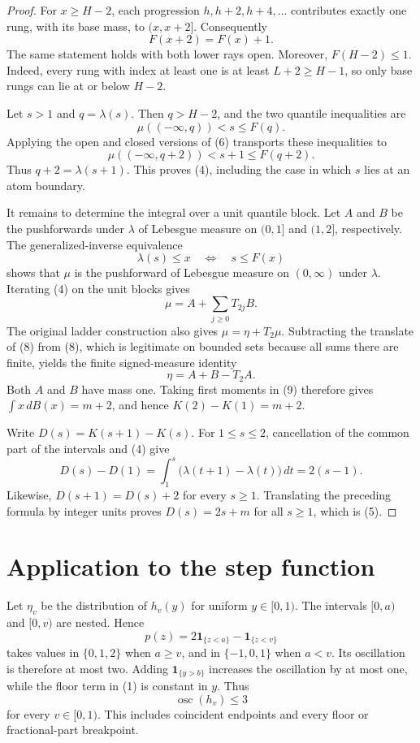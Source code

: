 \documentclass[11pt]{article}
\newcommand{\ind}{\mathbf 1}
\begin{document}
\begin{proof}
For \(x\geq H-2\), each progression
\(h,h+2,h+4,\ldots\) contributes exactly one rung, with its base mass,
to \((x,x+2]\).  Consequently
\[
 F(x+2)=F(x)+1.                                                  \tag{6}
\]
The same statement holds with both lower rays open.  Moreover,
\(F(H-2)\leq1\).  Indeed, every rung with index at least one is at least
\(L+2\geq H-1\), so only base rungs can lie at or below \(H-2\).

Let \(s>1\) and \(q=\lambda(s)\).  Then \(q>H-2\), and the two quantile
inequalities are
\[
 \mu(({-}\infty,q))<s\leq F(q).
\]
Applying the open and closed versions of (6) transports these inequalities
to
\[
 \mu(({-}\infty,q+2))<s+1\leq F(q+2).
\]
Thus \(q+2=\lambda(s+1)\).  This proves (4), including the case in which
\(s\) lies at an atom boundary.

It remains to determine the integral over a unit quantile block.  Let \(A\)
and \(B\) be the pushforwards under \(\lambda\) of Lebesgue measure on
\((0,1]\) and \((1,2]\), respectively.  The generalized-inverse equivalence
\[
 \lambda(s)\leq x\quad\Longleftrightarrow\quad s\leq F(x)        \tag{7}
\]
shows that \(\mu\) is the pushforward of Lebesgue measure on
\((0,\infty)\) under \(\lambda\).  Iterating (4) on the unit blocks gives
\[
 \mu=A+\sum_{j\geq0}T_{2j}B.                                   \tag{8}
\]
The original ladder construction also gives \(\mu=\eta+T_2\mu\).
Subtracting the translate of (8) from (8), which is legitimate on bounded
sets because all sums there are finite, yields the finite signed-measure
identity
\[
 \eta=A+B-T_2A.                                                  \tag{9}
\]
Both \(A\) and \(B\) have mass one.  Taking first moments in (9) therefore
gives \(\int x\,dB(x)=m+2\), and hence \(K(2)-K(1)=m+2\).

Write \(D(s)=K(s+1)-K(s)\).  For \(1\leq s\leq2\), cancellation of the
common part of the intervals and (4) give
\[
 D(s)-D(1)=\int_1^s\bigl(\lambda(t+1)-\lambda(t)\bigr)\,dt
            =2(s-1).
\]
Likewise, \(D(s+1)=D(s)+2\) for every \(s\geq1\).  Translating the preceding
formula by integer units proves \(D(s)=2s+m\) for all \(s\geq1\), which is
(5).
\end{proof}

\section{Application to the step function}

Let \(\eta_v\) be the distribution of \(h_v(y)\) for uniform
\(y\in[0,1)\).  The intervals \([0,a)\) and \([0,v)\) are nested.  Hence
\[
 p(z)=2\ind_{\{z<a\}}-\ind_{\{z<v\}}
\]
takes values in \(\{0,1,2\}\) when \(a\geq v\), and in
\(\{-1,0,1\}\) when \(a<v\).  Its oscillation is therefore at most two.
Adding \(\ind_{\{y>b\}}\) increases the oscillation by at most one, while
the floor term in (1) is constant in \(y\).  Thus
\[
 \operatorname{osc}(h_v)\leq3                                  \tag{10}
\]
for every \(v\in[0,1)\).  This includes coincident endpoints and every
floor or fractional-part breakpoint.
\end{document}
